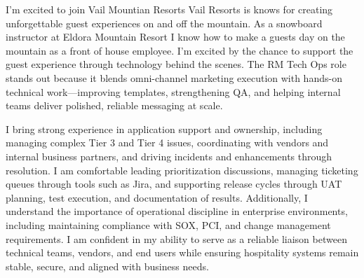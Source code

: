 \documentclass[11pt, a4paper]{awesome-cv}
\newcommand{\Companyname}{Vail Mountian Resorts }
\begin{document}
\begin{cvletter}
I'm excited to join \Companyname 
Vail Resorts is knows for creating unforgettable guest experiences on and off the mountain. As a snowboard instructor at Eldora Mountain Resort I know how to make a guests day on the mountain as a front of house employee. I’m excited by the chance to support the guest experience through technology behind the scenes. The RM Tech Ops role stands out because it blends omni-channel marketing execution with hands-on technical work—improving templates, strengthening QA, and helping internal teams deliver polished, reliable messaging at scale.

I bring strong experience in application support and ownership, including managing complex Tier 3 and Tier 4 issues, coordinating with vendors and internal business partners, and driving incidents and enhancements through resolution. I am comfortable leading prioritization discussions, managing ticketing queues through tools such as Jira, and supporting release cycles through UAT planning, test execution, and documentation of results. Additionally, I understand the importance of operational discipline in enterprise environments, including maintaining compliance with SOX, PCI, and change management requirements. I am confident in my ability to serve as a reliable liaison between technical teams, vendors, and end users while ensuring hospitality systems remain stable, secure, and aligned with business needs.

\end{cvletter}


\makeletterclosing
\end{document}
